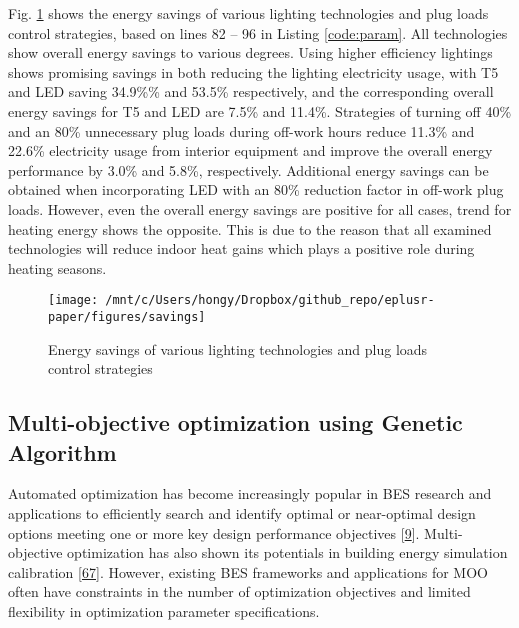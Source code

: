\documentclass[3p, times]{elsarticle} %
\begin{document}
Fig. \ref{fig:savings} shows the energy savings of various lighting
technologies and plug loads control strategies, based on lines 82 -- 96 in
Listing \ref{code:param}. All technologies show overall energy savings to
various degrees. Using higher efficiency lightings shows promising savings in
both reducing the lighting electricity usage, with T5 and LED saving 34.9\%\% and
53.5\% respectively, and the corresponding overall energy savings for T5 and LED
are 7.5\% and 11.4\%. Strategies of turning off 40\% and an 80\% unnecessary plug
loads during off-work hours reduce 11.3\% and 22.6\% electricity usage from
interior equipment and improve the overall energy performance by 3.0\% and 5.8\%,
respectively. Additional energy savings can be obtained when incorporating LED
with an 80\% reduction factor in off-work plug loads. However, even the overall
energy savings are positive for all cases, trend for heating energy shows the
opposite. This is due to the reason that all examined technologies will reduce
indoor heat gains which plays a positive role during heating seasons.

\begin{figure}[!htb]
\texttt{[image: /mnt/c/Users/hongy/Dropbox/github\_repo/eplusr-paper/figures/savings]} \caption{Energy savings of various lighting technologies and plug loads control strategies}\label{fig:savings}
\end{figure}

\hypertarget{multi-objective-optimization-using-genetic-algorithm}{%
\subsection{Multi-objective optimization using Genetic Algorithm}\label{multi-objective-optimization-using-genetic-algorithm}}

Automated optimization has become increasingly popular in BES research and
applications to efficiently search and identify optimal or near-optimal design
options meeting one or more key design performance objectives {[}\protect\hyperlink{ref-Attia2013a}{9}{]}.
Multi-objective optimization has also shown its potentials in building energy
simulation calibration {[}\protect\hyperlink{ref-Yang2015c}{67}{]}. However, existing BES frameworks and
applications for MOO often have constraints in the number of optimization
objectives and limited flexibility in optimization parameter specifications.
\end{document}
